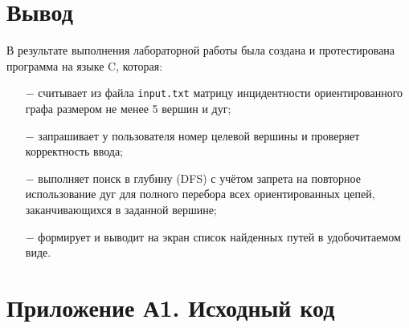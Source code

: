 \documentclass[oneside,a4paper,14pt]{extarticle}
\begin{document}
\clearpage
\section*{Вывод}

В результате выполнения лабораторной работы была создана и протестирована программа на языке C, которая:

\begin{itemize}
    \item[$-$] считывает из файла \texttt{input.txt} матрицу инцидентности ориентированного графа размером не менее 5 вершин и дуг;
    \item[$-$] запрашивает у пользователя номер целевой вершины и проверяет корректность ввода;
    \item[$-$] выполняет поиск в глубину (DFS) с учётом запрета на повторное использование дуг для полного перебора всех ориентированных цепей, заканчивающихся в заданной вершине;
    \item[$-$] формирует и выводит на экран список найденных путей в удобочитаемом виде.
\end{itemize}


\clearpage
\section*{Приложение А1. Исходный код}
\inputminted{c}{code/src/main.c}
\end{document}
